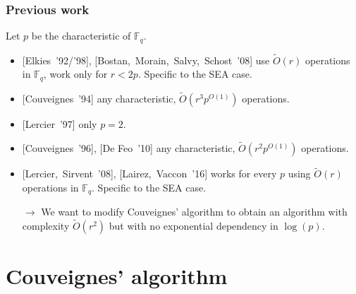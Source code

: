 \documentclass[10pt,a4paper]{beamer}
\theoremstyle{plain}
\theoremstyle{definition}
\theoremstyle{definition}
\theoremstyle{definition}
\theoremstyle{definition}
\theoremstyle{remark}
\theoremstyle{remark}
\begin{document}

\begin{frame}
\frametitle{Previous work}

Let $p$ be the characteristic of $\mathbb{F}_q$.

\begin{itemize}
\item{} [Elkies~'92/'98],  %
[Bostan,~Morain,~Salvy,~Schost~'08] use $\tilde{O}(r)$ operations in $\mathbb{F}_q$, work only for $r < 2p$. Specific to the SEA case.
\item{} [Couveignes~'94] any characteristic, $\tilde{O}(r^3
p^{O(1)})$ operations.
\item{} [Lercier~'97] only $p=2$.
\item{} [Couveignes~'96], [De Feo~'10] any characteristic, $\tilde{O}(r^2
p^{O(1)})$ operations.
\item{} [Lercier,~Sirvent~'08], [Lairez,~Vaccon~'16] works for every $p$ using $\tilde{O}(r)$ operations in $\mathbb{F}_q$. Specific to the SEA case.
\end{itemize}
\begin{itemize}


\item[$\rightarrow$] We want to modify Couveignes' algorithm to obtain an algorithm with complexity $\tilde{O}(r^2)$ but with no exponential dependency in $\log(p)$.

\end{itemize}
\end{frame}


\section{Couveignes' algorithm}
\end{document}
